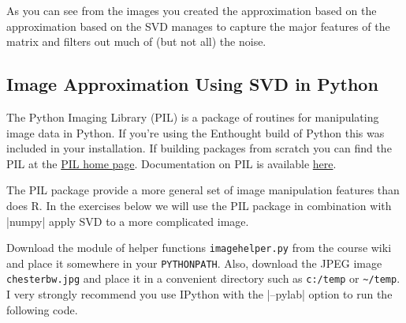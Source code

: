 As you can see from the images you created the approximation based on the approximation based on the SVD manages to capture the major features of the matrix and filters out much of (but not all) the noise.

\subsection{Image Approximation Using SVD in Python}

The Python Imaging Library (PIL) is a package of routines for manipulating image data in Python. If you're using the Enthought build of Python this was included in your installation. If building packages from scratch you can find the PIL at the \href{http://www.pythonware.com/products/pil/}{PIL home page}. Documentation on PIL is available \href{http://www.pythonware.com/library/pil/handbook/index.htm}{here}.

The PIL package provide a more general set of image manipulation features than does R.  In the exercises below we will use the PIL package in combination with |numpy| apply SVD to a more complicated image.

Download the module of helper functions \verb|imagehelper.py| from the course wiki and place it somewhere in your \verb|PYTHONPATH|. Also, download the JPEG image \verb|chesterbw.jpg| and place it in a convenient directory such as \verb|c:/temp| or \verb|~/temp|. {\color{DarkRed} I very strongly recommend you use IPython with the |--pylab| option to run the following code.}

